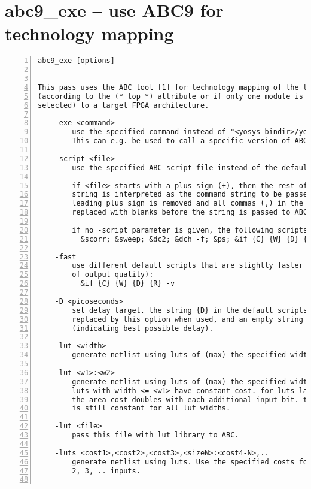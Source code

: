\section{abc9\_exe -- use ABC9 for technology mapping}
\label{cmd:abc9_exe}
\begin{lstlisting}[numbers=left,frame=single]
    abc9_exe [options]

 
This pass uses the ABC tool [1] for technology mapping of the top module
(according to the (* top *) attribute or if only one module is currently
selected) to a target FPGA architecture.

    -exe <command>
        use the specified command instead of "<yosys-bindir>/yosys-abc" to execute ABC.
        This can e.g. be used to call a specific version of ABC or a wrapper.

    -script <file>
        use the specified ABC script file instead of the default script.

        if <file> starts with a plus sign (+), then the rest of the filename
        string is interpreted as the command string to be passed to ABC. The
        leading plus sign is removed and all commas (,) in the string are
        replaced with blanks before the string is passed to ABC.

        if no -script parameter is given, the following scripts are used:
          &scorr; &sweep; &dc2; &dch -f; &ps; &if {C} {W} {D} {R} -v; &mfs

    -fast
        use different default scripts that are slightly faster (at the cost
        of output quality):
          &if {C} {W} {D} {R} -v

    -D <picoseconds>
        set delay target. the string {D} in the default scripts above is
        replaced by this option when used, and an empty string otherwise
        (indicating best possible delay).

    -lut <width>
        generate netlist using luts of (max) the specified width.

    -lut <w1>:<w2>
        generate netlist using luts of (max) the specified width <w2>. All
        luts with width <= <w1> have constant cost. for luts larger than <w1>
        the area cost doubles with each additional input bit. the delay cost
        is still constant for all lut widths.

    -lut <file>
        pass this file with lut library to ABC.

    -luts <cost1>,<cost2>,<cost3>,<sizeN>:<cost4-N>,..
        generate netlist using luts. Use the specified costs for luts with 1,
        2, 3, .. inputs.


\end{lstlisting}
